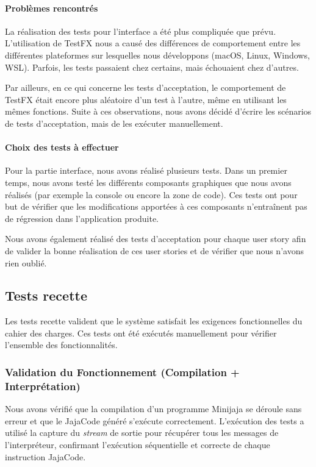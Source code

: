 \paragraph{Problèmes rencontrés}
La réalisation des tests pour l'interface a été plus compliquée que prévu. L'utilisation de TestFX nous a causé des différences de comportement entre les différentes plateformes sur lesquelles nous développons (macOS, Linux, Windows, WSL). Parfois, les tests passaient chez certains, mais échouaient chez d'autres.

Par ailleurs, en ce qui concerne les tests d'acceptation, le comportement de TestFX était encore plus aléatoire d'un test à l'autre, même en utilisant les mêmes fonctions. Suite à ces observations, nous avons décidé d'écrire les scénarios de tests d'acceptation, mais de les exécuter manuellement.

\paragraph{Choix des tests à effectuer}
Pour la partie interface, nous avons réalisé plusieurs tests. Dans un premier temps, nous avons testé les différents composants graphiques que nous avons réalisés (par exemple la console ou encore la zone de code). Ces tests ont pour but de vérifier que les modifications apportées à ces composants n'entraînent pas de régression dans l'application produite.

Nous avons également réalisé des tests d'acceptation pour chaque user story afin de valider la bonne réalisation de ces user stories et de vérifier que nous n'avons rien oublié.

\subsection{Tests recette}

Les tests recette valident que le système satisfait les exigences fonctionnelles du cahier des charges. Ces tests ont été exécutés manuellement pour vérifier l'ensemble des fonctionnalités.

\subsubsection{Validation du Fonctionnement (Compilation + Interprétation)}

Nous avons vérifié que la compilation d'un programme Minijaja se déroule sans erreur et que le JajaCode généré s'exécute correctement. L'exécution des tests a utilisé la capture du \textit{stream} de sortie pour récupérer tous les messages de l'interpréteur, confirmant l'exécution séquentielle et correcte de chaque instruction JajaCode.

